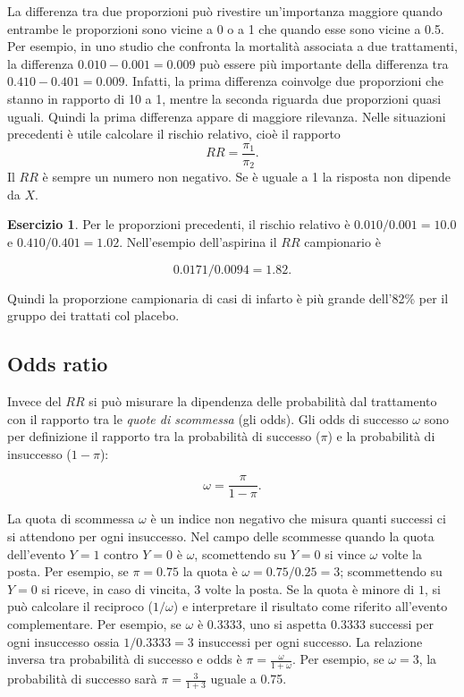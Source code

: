 \documentclass[
  11pt,
]{krantz}
\theoremstyle{definition}
\theoremstyle{definition}
\theoremstyle{definition}
\newtheorem{exercise}{Esercizio}[chapter]
\theoremstyle{definition}
\theoremstyle{remark}
\begin{document}
La differenza tra due proporzioni può rivestire un'importanza maggiore quando entrambe le proporzioni sono vicine a 0 o a 1 che quando esse sono vicine a 0.5. Per esempio, in uno studio che confronta la mortalità associata a due trattamenti, la differenza \(0.010 - 0.001 = 0.009\) può essere più importante della differenza tra \(0.410 - 0.401 = 0.009\). Infatti, la prima differenza coinvolge due proporzioni che stanno in rapporto di 10 a 1, mentre la seconda riguarda due proporzioni quasi uguali. Quindi la prima differenza appare di maggiore rilevanza. Nelle situazioni precedenti è utile calcolare il rischio relativo, cioè il rapporto \[RR = \frac{\pi_1}{\pi_2}.\] Il \(RR\) è sempre un numero non negativo. Se è uguale a 1 la risposta non dipende da \(X\).

\begin{exercise}
Per le proporzioni precedenti, il rischio relativo è \(0.010/0.001=10.0\) e \(0.410/0.401=1.02\). Nell'esempio dell'aspirina il \(RR\) campionario è

\[
0.0171/0.0094 = 1.82.
\]

Quindi la proporzione campionaria di casi di infarto è più grande dell'82\% per il gruppo dei trattati col placebo.
\end{exercise}

\hypertarget{odds-ratio}{%
\subsection{Odds ratio}\label{odds-ratio}}

Invece del \(RR\) si può misurare la dipendenza delle probabilità dal trattamento con il rapporto tra le \emph{quote di scommessa} (gli odds). Gli odds di successo \(\omega\) sono per definizione il rapporto tra la probabilità di successo (\(\pi\)) e la probabilità di insuccesso (\(1 - \pi\)):

\[
\omega = \frac{\pi}{1 - \pi}.
\]

La quota di scommessa \(\omega\) è un indice non negativo che misura quanti successi ci si attendono per ogni insuccesso. Nel campo delle scommesse quando la quota dell'evento \(Y = 1\) contro \(Y = 0\) è \(\omega\), scomettendo su \(Y = 0\) si vince \(\omega\) volte la posta. Per esempio, se \(\pi = 0.75\) la quota è \(\omega = 0.75/0.25 = 3\); scommettendo su \(Y = 0\) si riceve, in caso di vincita, 3 volte la posta. Se la quota è minore di \(1\), si può calcolare il reciproco (\(1/\omega\)) e interpretare il risultato come riferito all'evento complementare. Per esempio, se \(\omega\) è \(0.3333\), uno si aspetta \(0.3333\) successi per ogni insuccesso ossia \(1/0.3333=3\) insuccessi per ogni successo. La relazione inversa tra probabilità di successo e odds è \(\pi =\frac{\omega}{1 + \omega}.\) Per esempio, se \(\omega =3\), la probabilità di successo sarà \(\pi = \frac{3}{1 + 3}\) uguale a 0.75.
\end{document}

